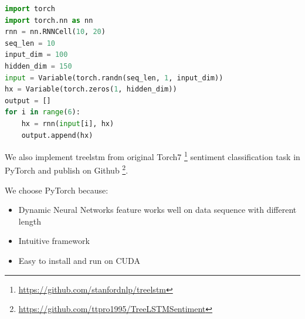 \begin{lstlisting}[caption={RNN},label={lst:pytorchrnn}, language={python}]
import torch
import torch.nn as nn
rnn = nn.RNNCell(10, 20)
seq_len = 10
input_dim = 100
hidden_dim = 150
input = Variable(torch.randn(seq_len, 1, input_dim))
hx = Variable(torch.zeros(1, hidden_dim))
output = []
for i in range(6):
    hx = rnn(input[i], hx)
    output.append(hx)
\end{lstlisting}

We also implement treelstm from original Torch7 \footnote{\url{https://github.com/stanfordnlp/treelstm}} sentiment classification task in PyTorch and publish on Github \footnote{\url{https://github.com/ttpro1995/TreeLSTMSentiment}}.

We choose PyTorch because:
\begin{itemize}
	\item Dynamic Neural Networks feature works well on data sequence with different length
	\item Intuitive framework
	\item Easy to install and run on CUDA
\end{itemize}
